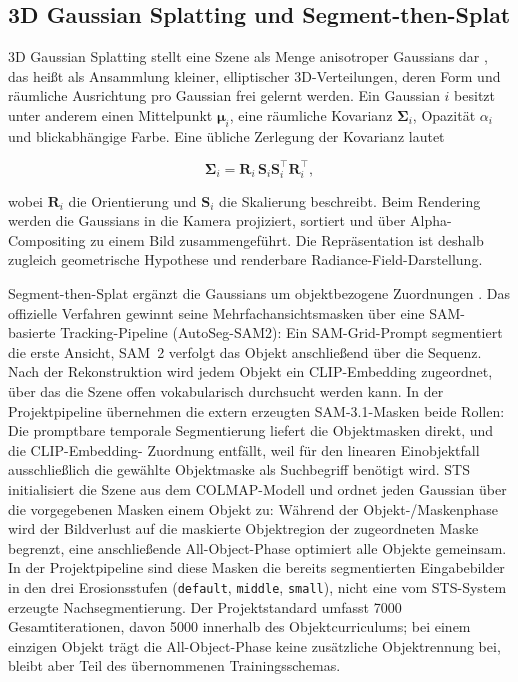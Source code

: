 \subsection{3D Gaussian Splatting und Segment-then-Splat}

3D Gaussian Splatting stellt eine Szene als Menge anisotroper Gaussians dar
\parencite{kerbl2023gaussian}, das heißt als Ansammlung kleiner, elliptischer
3D-Verteilungen, deren Form und räumliche Ausrichtung pro Gaussian frei
gelernt werden. Ein Gaussian $i$ besitzt unter anderem einen
Mittelpunkt $\boldsymbol{\mu}_i$, eine räumliche Kovarianz
$\boldsymbol{\Sigma}_i$, Opazität $\alpha_i$ und blickabhängige Farbe. Eine
übliche Zerlegung der Kovarianz lautet

\begin{equation}
	\boldsymbol{\Sigma}_i =
	\mathbf{R}_i\,\mathbf{S}_i\mathbf{S}_i^{\top}\mathbf{R}_i^{\top},
	\label{eq:gaussian-covariance}
\end{equation}

wobei $\mathbf{R}_i$ die Orientierung und $\mathbf{S}_i$ die Skalierung
beschreibt. Beim Rendering werden die Gaussians in die Kamera projiziert,
sortiert und über Alpha-Compositing zu einem Bild zusammengeführt. Die
Repräsentation ist deshalb zugleich geometrische Hypothese und renderbare
Radiance-Field-Darstellung.

Segment-then-Splat ergänzt die Gaussians um objektbezogene Zuordnungen
\parencite{lu2025segment}. Das offizielle Verfahren gewinnt seine
Mehrfachansichtsmasken über eine SAM-basierte Tracking-Pipeline
(AutoSeg-SAM2): Ein SAM-Grid-Prompt segmentiert die erste Ansicht, SAM~2
verfolgt das Objekt anschließend über die Sequenz. Nach der Rekonstruktion
wird jedem Objekt ein CLIP-Embedding zugeordnet, über das die Szene offen
vokabularisch durchsucht werden kann. In der Projektpipeline übernehmen die
extern erzeugten SAM-3.1-Masken beide Rollen: Die promptbare temporale
Segmentierung liefert die Objektmasken direkt, und die CLIP-Embedding-
Zuordnung entfällt, weil für den linearen Einobjektfall ausschließlich die
gewählte Objektmaske als Suchbegriff benötigt wird. STS initialisiert die
Szene aus dem COLMAP-Modell und ordnet jeden Gaussian über die vorgegebenen
Masken einem Objekt zu: Während der Objekt-/Maskenphase wird der Bildverlust
auf die maskierte Objektregion der zugeordneten Maske begrenzt, eine
anschließende All-Object-Phase optimiert alle Objekte gemeinsam. In der
Projektpipeline sind diese Masken die bereits segmentierten Eingabebilder in
den drei Erosionsstufen (\texttt{default}, \texttt{middle}, \texttt{small}),
nicht eine vom STS-System erzeugte Nachsegmentierung. Der Projektstandard
umfasst 7000 Gesamtiterationen, davon 5000 innerhalb des Objektcurriculums;
bei einem einzigen Objekt trägt die All-Object-Phase keine zusätzliche
Objektrennung bei, bleibt aber Teil des übernommenen Trainingsschemas.

